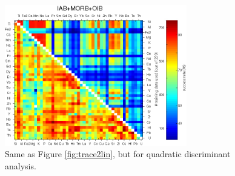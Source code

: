\begin{figure}[htbp]
  \includegraphics[width=300]{figures/xPlotTrace2_quadratic_err.jpg}
  \caption[Same  as Figure  \ref{fig:trace2lin}, but  for  quadratic discriminant analysis]
{Same  as Figure  \ref{fig:trace2lin}, but  for  quadratic discriminant analysis.}
  \label{fig:trace2quad}
\end{figure}

\clearpage


